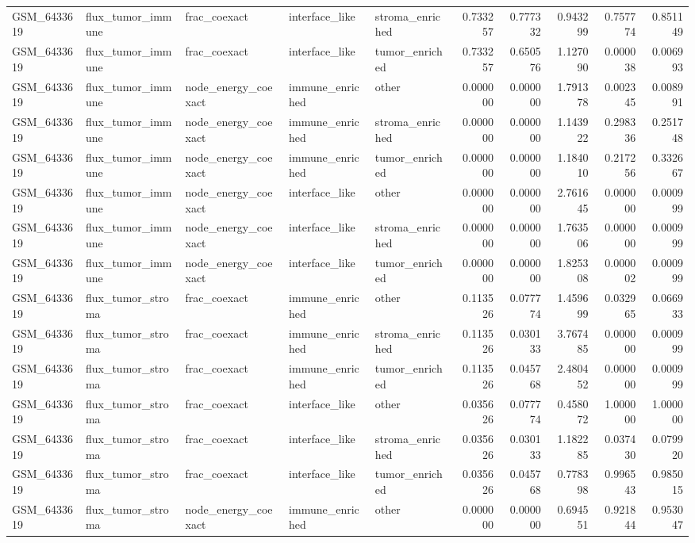 \begin{table}
\begin{tabular}{lllllrrrrr}
GSM_6433619 & flux_tumor_immune & frac_coexact & interface_like & stroma_enriched & 0.733257 & 0.777332 & 0.943299 & 0.757774 & 0.851149 \\
GSM_6433619 & flux_tumor_immune & frac_coexact & interface_like & tumor_enriched & 0.733257 & 0.650576 & 1.127090 & 0.000038 & 0.006993 \\
GSM_6433619 & flux_tumor_immune & node_energy_coexact & immune_enriched & other & 0.000000 & 0.000000 & 1.791378 & 0.002345 & 0.008991 \\
GSM_6433619 & flux_tumor_immune & node_energy_coexact & immune_enriched & stroma_enriched & 0.000000 & 0.000000 & 1.143922 & 0.298336 & 0.251748 \\
GSM_6433619 & flux_tumor_immune & node_energy_coexact & immune_enriched & tumor_enriched & 0.000000 & 0.000000 & 1.184010 & 0.217256 & 0.332667 \\
GSM_6433619 & flux_tumor_immune & node_energy_coexact & interface_like & other & 0.000000 & 0.000000 & 2.761645 & 0.000000 & 0.000999 \\
GSM_6433619 & flux_tumor_immune & node_energy_coexact & interface_like & stroma_enriched & 0.000000 & 0.000000 & 1.763506 & 0.000000 & 0.000999 \\
GSM_6433619 & flux_tumor_immune & node_energy_coexact & interface_like & tumor_enriched & 0.000000 & 0.000000 & 1.825308 & 0.000002 & 0.000999 \\
GSM_6433619 & flux_tumor_stroma & frac_coexact & immune_enriched & other & 0.113526 & 0.077774 & 1.459699 & 0.032965 & 0.066933 \\
GSM_6433619 & flux_tumor_stroma & frac_coexact & immune_enriched & stroma_enriched & 0.113526 & 0.030133 & 3.767485 & 0.000000 & 0.000999 \\
GSM_6433619 & flux_tumor_stroma & frac_coexact & immune_enriched & tumor_enriched & 0.113526 & 0.045768 & 2.480452 & 0.000000 & 0.000999 \\
GSM_6433619 & flux_tumor_stroma & frac_coexact & interface_like & other & 0.035626 & 0.077774 & 0.458072 & 1.000000 & 1.000000 \\
GSM_6433619 & flux_tumor_stroma & frac_coexact & interface_like & stroma_enriched & 0.035626 & 0.030133 & 1.182285 & 0.037430 & 0.079920 \\
GSM_6433619 & flux_tumor_stroma & frac_coexact & interface_like & tumor_enriched & 0.035626 & 0.045768 & 0.778398 & 0.996543 & 0.985015 \\
GSM_6433619 & flux_tumor_stroma & node_energy_coexact & immune_enriched & other & 0.000000 & 0.000000 & 0.694551 & 0.921844 & 0.953047 \\

\end{tabular}
\end{table}
